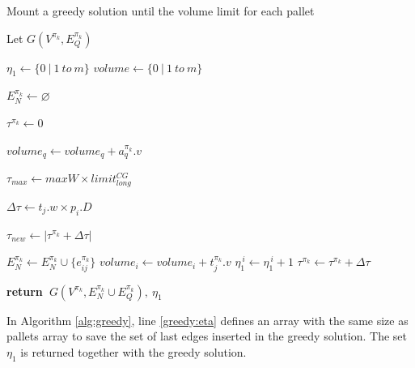 \documentclass[preprint,authoryear]{elsarticle}
\renewcommand{\Return}{\State \bf {return}~}
\begin{document}
\begin{algorithm}[H]
	\caption{Mount a greedy solution until the volume limit for each pallet}  \label{alg:greedy}
	
	\begin{algorithmic}[1]
		
		
		\State Let $G(V^{\pi_k}, E_Q^{\pi_k})$
		
		\State $\eta_1 \gets \{0\ |\ 1\ to\ m \}$ \label{greedy:eta}
		\State $volume \gets \{0\ |\ 1\ to\ m \}$
		
	
		\State $E_N^{\pi_k} \gets \varnothing$ 
		
		\State $\tau^{\pi_k} \gets 0$	 	
		
				\State $volume_q \gets volume_q + a_q^{\pi_k}.v$ 
			\EndIf		
		\EndFor
		
		\State $\tau_{max} \gets maxW \times limit^{CG}_{long}$ 
		
		
			\State $\Delta\tau \gets t_j.w \times p_i.D$
			
			\State $\tau_{new} \gets | \tau^{\pi_k} + \Delta\tau |$
			
			 \label{greedy:ts}
					 
				\State $E_N^{\pi_k} \gets E_N^{\pi_k} \cup \{e_{ij}^{\pi_k}\}$ 
				\State $volume_i \gets volume_i + t_j^{\pi_k}.v$
				\State $\eta_1^{\ i} \gets \eta_1^{\ i} + 1$ 
				\State $\tau^{\pi_k} \gets \tau^{\pi_k} + \Delta\tau$
				
			\EndIf
		\EndFor {}
		
		\Return $G(V^{\pi_k}, E_N^{\pi_k} \cup E_Q^{\pi_k}),\ \eta_1$
		
		\EndProcedure
		
	\end{algorithmic}
\end{algorithm}

In Algorithm \ref{alg:greedy}, line \ref{greedy:eta} defines an array with the same size as pallets array to save the set of last edges inserted in the greedy solution. The set $\eta_1$ is returned together with the greedy solution.
\end{document}
